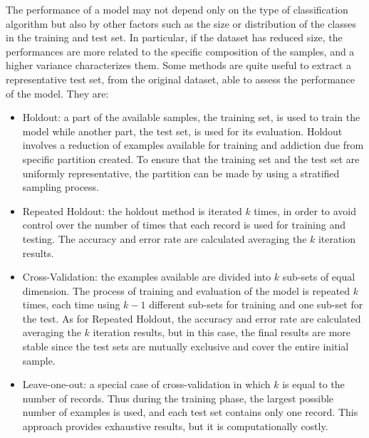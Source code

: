 The performance of a model may not depend only on the type of classification algorithm but also by other factors such as the size or distribution of the classes in the training and test set. In particular, if the dataset has reduced size, the performances are more related to the specific composition of the samples, and a higher variance characterizes them. Some methods are quite useful to extract a representative test set, from the original dataset, able to assess the performance of the model. They are:
\begin{itemize}
	\item Holdout: a part of the available samples, the training set, is used to train the model while another part, the test set, is used for its evaluation. Holdout involves a reduction of examples available for training and addiction due from specific partition created. To ensure that the training set and the test set are uniformly representative, the partition can be made by using a stratified sampling process.
	\item Repeated Holdout: the holdout method is iterated $k$ times, in order to avoid control over the number of times that each record is used for training and testing. The accuracy and error rate are calculated averaging the $k$ iteration results.
	\item Cross-Validation: the examples available are divided into $k$ sub-sets of equal dimension. The process of training and evaluation of the model is repeated $k$ times, each time using $k-1$ different sub-sets for training and one sub-set for the test. As for Repeated Holdout, the accuracy and error rate are calculated averaging the $k$ iteration results, but in this case, the final results are more stable since the test sets are mutually exclusive and cover the entire initial sample.
	\item Leave-one-out: a special case of cross-validation in which $k$ is equal to the number of records. Thus during the training phase, the largest possible number of examples is used, and each test set contains only one record. This approach provides exhaustive results, but it is computationally costly.
\end{itemize}